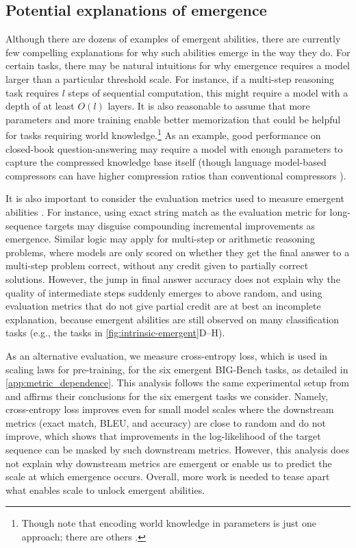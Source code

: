 \subsection{Potential explanations of emergence}\label{subsec:potential_explanations}
Although there are dozens of examples of emergent abilities, there are currently few compelling explanations for why such abilities emerge in the way they do. For certain tasks, there may be natural intuitions for why emergence requires a model larger than a particular threshold scale. For instance, if a multi-step reasoning task requires $l$ steps of sequential computation, this might require a model with a depth of at least $O\left(l\right)$ layers. It is also reasonable to assume that more parameters and more training enable better memorization that could be helpful for tasks requiring world knowledge.\footnote{Though note that encoding world knowledge in parameters is just one approach; there are others \citep[e.g.,][]{guu2020realm,borgeaud2021improving}.}
As an example, good performance on closed-book question-answering may require a model with enough parameters to capture the compressed knowledge base itself (though language model-based compressors can have higher compression ratios than conventional compressors \citep{bellardlmcompressor}).

It is also important to consider the evaluation metrics used to measure emergent abilities \citep{bigbench}. For instance, using exact string match as the evaluation metric for long-sequence targets may disguise compounding incremental improvements as emergence. Similar logic may apply for multi-step or arithmetic reasoning problems, where models are only scored on whether they get the final answer to a multi-step problem correct, without any credit given to partially correct solutions. However, the jump in final answer accuracy does not explain why the quality of intermediate steps suddenly emerges to above random, and using evaluation metrics that do not give partial credit are at best an incomplete explanation, because emergent abilities are still observed on many classification tasks (e.g., the tasks in \ref{fig:intrinsic-emergent}D--H).

As an alternative evaluation, we measure cross-entropy loss, which is used in scaling laws for pre-training, for the six emergent BIG-Bench tasks, as detailed in \ref{app:metric_dependence}.
This analysis follows the same experimental setup from \citet{bigbench} and affirms their conclusions for the six emergent tasks we consider. Namely, cross-entropy loss improves even for small model scales where the downstream metrics (exact match, BLEU, and accuracy) are close to random and do not improve, which shows that improvements in the log-likelihood of the target sequence can be masked by such downstream metrics. However, this analysis does not explain why downstream metrics are emergent or enable us to predict the scale at which emergence occurs. Overall, more work is needed to tease apart what enables scale to unlock emergent abilities.


